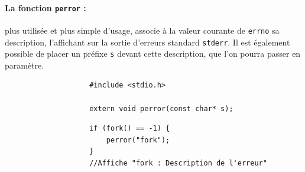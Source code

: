 			\paragraph{La fonction \lstinline!perror! :} plus utilisée et plus simple d'usage, associe à la valeur courante de \lstinline!errno! sa description, l'affichant sur la sortie d'erreurs standard \lstinline!stderr!. Il est également possible de placer un préfixe \lstinline!s! devant cette description, que l'on pourra passer en paramètre.
				\begin{lstlisting}
					#include <stdio.h>
					
					extern void perror(const char* s);
				\end{lstlisting}
				
				\begin{lstlisting}
					if (fork() == -1) {
						perror("fork");
					}
					//Affiche "fork : Description de l'erreur"
				\end{lstlisting}

			
			
			
		
			
			
			
			
			
			
			